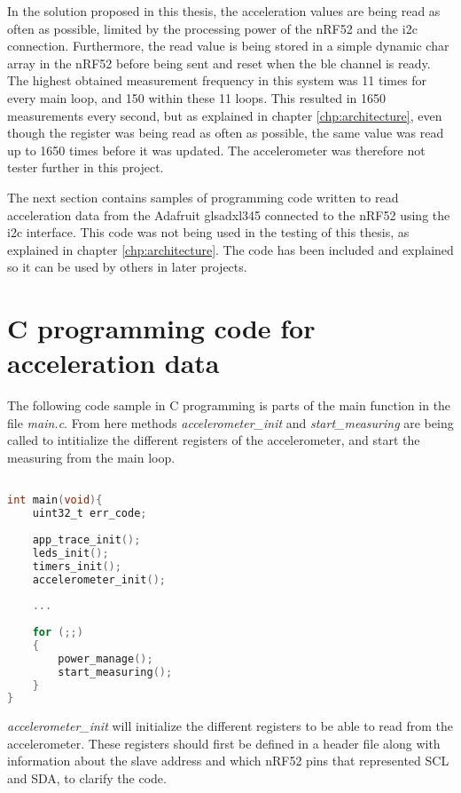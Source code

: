 \noindent In the solution proposed in this thesis, the acceleration values are being read as often as possible, limited by the processing power of the \gls{nRF52} and the \gls{i2c} connection. Furthermore, the read value is being stored in a simple dynamic char array in the \gls{nRF52} before being sent and reset when the \gls{ble} channel is ready. The highest obtained measurement frequency in this system was 11 times for every main loop, and 150 within these 11 loops. This resulted in 1650 measurements every second, but as explained in chapter \ref{chp:architecture}, even though the register was being read as often as possible, the same value was read up to 1650 times before it was updated. The accelerometer was therefore not tester further in this project. 

\noindent The next section contains samples of programming code written to read acceleration data from the Adafruit gls{adxl345} connected to the \gls{nRF52} using the \gls{i2c} interface. This code was not being used in the testing of this thesis, as explained in chapter \ref{chp:architecture}. The code has been included and explained so it can be used by others in later projects.

\section{C programming code for acceleration data} \label{subsec:progInC}

The following code sample in C programming is parts of the main function in the file \textit{main.c}. From here methods \textit{accelerometer\_init} and \textit{start\_measuring} are being called to intitialize the different registers of the accelerometer, and start the measuring from the main loop. 
\newpage
\begin{lstlisting}[language=C]

int main(void){
	uint32_t err_code; 
	
	app_trace_init(); 
	leds_init(); 
	timers_init();
	accelerometer_init(); 
	
	...
	
	for (;;)
	{
		power_manage();
		start_measuring();
	}
}
\end{lstlisting}


\textit{accelerometer\_init} will initialize the different registers to be able to read from the accelerometer. These registers should first be defined in a header file along with information about the slave address and which \gls{nRF52} pins that represented SCL and SDA, to clarify the code. 


